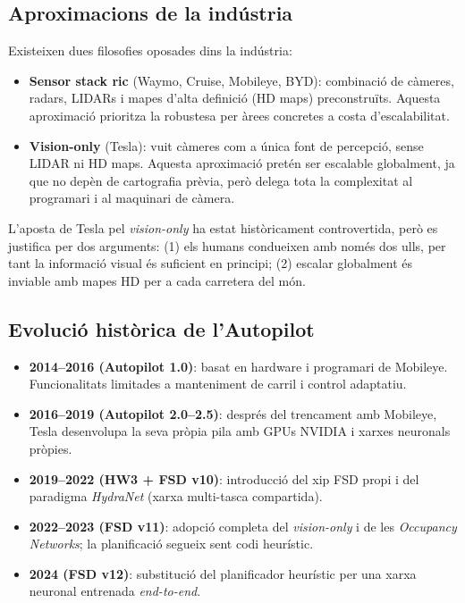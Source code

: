 \documentclass[11pt,a4paper]{article}
\begin{document}
\subsection{Aproximacions de la indústria}

Existeixen dues filosofies oposades dins la indústria:

\begin{itemize}[leftmargin=*]
    \item \textbf{Sensor stack ric} (Waymo, Cruise, Mobileye, BYD): combinació de càmeres, radars, LIDARs i mapes d'alta definició (HD maps) preconstruïts. Aquesta aproximació prioritza la robustesa per àrees concretes a costa d'escalabilitat.
    \item \textbf{Vision-only} (Tesla): vuit càmeres com a única font de percepció, sense LIDAR ni HD maps. Aquesta aproximació pretén ser escalable globalment, ja que no depèn de cartografia prèvia, però delega tota la complexitat al programari i al maquinari de càmera.
\end{itemize}

L'aposta de Tesla pel \emph{vision-only} ha estat històricament controvertida, però es justifica per dos arguments: (1) els humans condueixen amb només dos ulls, per tant la informació visual és suficient en principi; (2) escalar globalment és inviable amb mapes HD per a cada carretera del món.

\subsection{Evolució històrica de l'Autopilot}

\begin{itemize}[leftmargin=*]
    \item \textbf{2014--2016 (Autopilot 1.0)}: basat en hardware i programari de Mobileye. Funcionalitats limitades a manteniment de carril i control adaptatiu.
    \item \textbf{2016--2019 (Autopilot 2.0--2.5)}: després del trencament amb Mobileye, Tesla desenvolupa la seva pròpia pila amb GPUs NVIDIA i xarxes neuronals pròpies.
    \item \textbf{2019--2022 (HW3 + FSD v10)}: introducció del xip FSD propi i del paradigma \emph{HydraNet} (xarxa multi-tasca compartida).
    \item \textbf{2022--2023 (FSD v11)}: adopció completa del \emph{vision-only} i de les \emph{Occupancy Networks}; la planificació segueix sent codi heurístic.
    \item \textbf{2024 (FSD v12)}: substitució del planificador heurístic per una xarxa neuronal entrenada \emph{end-to-end}.
\end{itemize}
\end{document}

